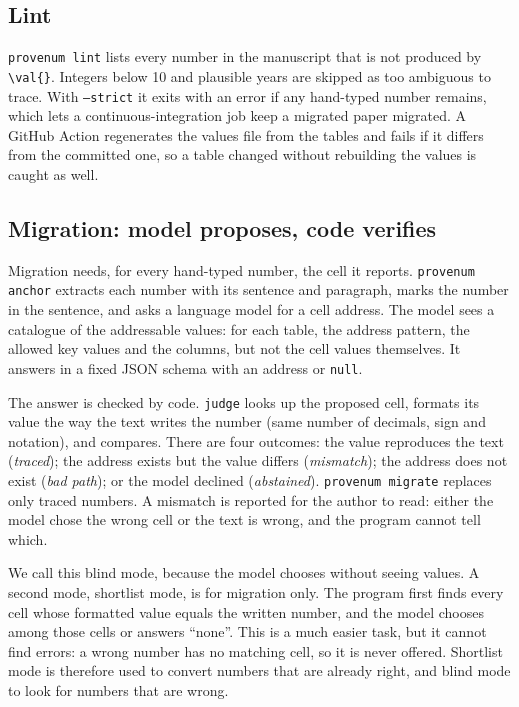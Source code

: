 \subsection{Lint}

\texttt{provenum lint} lists every number in the manuscript that is not produced by
\texttt{\textbackslash val\{\}}. Integers below 10 and plausible years are skipped as too
ambiguous to trace. With \texttt{--strict} it exits with an error if any hand-typed number
remains, which lets a continuous-integration job keep a migrated paper migrated. A GitHub Action
regenerates the values file from the tables and fails if it differs from the committed one, so
a table changed without rebuilding the values is caught as well.

\subsection{Migration: model proposes, code verifies}
\label{sec:anchor}

Migration needs, for every hand-typed number, the cell it reports. \texttt{provenum anchor}
extracts each number with its sentence and paragraph, marks the number in the sentence, and asks
a language model for a cell address. The model sees a catalogue of the addressable values: for
each table, the address pattern, the allowed key values and the columns, but not the cell values
themselves. It answers in a fixed JSON schema with an address or \texttt{null}.

The answer is checked by code. \texttt{judge} looks up the proposed cell, formats its value the
way the text writes the number (same number of decimals, sign and notation), and compares. There
are four outcomes: the value reproduces the text (\emph{traced}); the address exists but the
value differs (\emph{mismatch}); the address does not exist (\emph{bad path}); or the model
declined (\emph{abstained}). \texttt{provenum migrate} replaces only traced numbers. A mismatch is
reported for the author to read: either the model chose the wrong cell or the text is wrong, and
the program cannot tell which.

We call this blind mode, because the model chooses without seeing values. A second mode,
shortlist mode, is for migration only. The program first finds every cell whose formatted value
equals the written number, and the model chooses among those cells or answers ``none''. This is a
much easier task, but it cannot find errors: a wrong number has no matching cell, so it is never
offered. Shortlist mode is therefore used to convert numbers that are already right, and blind
mode to look for numbers that are wrong.

